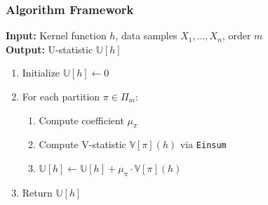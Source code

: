 \documentclass[9pt]{beamer}
\theoremstyle{mystyle}
\theoremstyle{mystyletwo}
\newcommand{\ustat}{\mathbb{U}}
\newcommand{\vstat}{\mathbb{V}}
\newcommand{\partition}{\Pi}
\newcommand{\partitionp}[1]{\partition_{#1}}
\begin{document}
\begin{frame}
\frametitle{Algorithm Framework }

\begin{center}
\begin{minipage}{1.0\textwidth}

\begin{tcolorbox}[colback=white,colframe=blue!50!black,title=Basic Algorithm Framework]
\begin{flushleft}
\textbf{Input:} Kernel function $h$, data samples $X_1,\ldots,X_n$, order $m$ \\
\textbf{Output:} U-statistic $\ustat[h]$
\end{flushleft}

\vspace{0.2cm}
\begin{enumerate}
    \item Initialize $\ustat[h] \gets 0$
    \item For each partition $\pi \in \partitionp{m}$:
    \begin{enumerate}
        \item Compute coefficient $\mu_{\pi}$
        \item Compute V-statistic $\vstat[\pi](h)$ via \texttt{Einsum}
        \item $\ustat[h] \gets \ustat[h] + \mu_{\pi} \cdot \vstat[\pi](h)$
    \end{enumerate}
    \item Return $\ustat[h]$
\end{enumerate}
\end{tcolorbox}


\end{minipage}
\end{center}

\end{frame}
\end{document}
